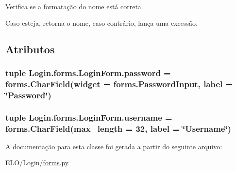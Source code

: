 Verifica se a formatação do nome está correta. 

Caso esteja, retorna o nome, caso contrário, lança uma excessão. 

\subsection{Atributos}
\hypertarget{classLogin_1_1forms_1_1LoginForm_a23e321f790e9c7bfc3e9abf767826a2d}{
\subsubsection[{password}]{\setlength{\rightskip}{0pt plus 5cm}tuple Login.\-forms.\-Login\-Form.\-password = forms.\-Char\-Field(widget = forms.\-Password\-Input, label = \char`\"{}Password\char`\"{})\hspace{0.3cm}{\ttfamily [static]}}}\label{d0/db9/classLogin_1_1forms_1_1LoginForm_a23e321f790e9c7bfc3e9abf767826a2d}
\hypertarget{classLogin_1_1forms_1_1LoginForm_af3766bb4ea8cabdf57ad77214b7545fd}{
\subsubsection[{username}]{\setlength{\rightskip}{0pt plus 5cm}tuple Login.\-forms.\-Login\-Form.\-username = forms.\-Char\-Field(max\-\_\-length = 32, label = \char`\"{}Username\char`\"{})\hspace{0.3cm}{\ttfamily [static]}}}\label{d0/db9/classLogin_1_1forms_1_1LoginForm_af3766bb4ea8cabdf57ad77214b7545fd}


A documentação para esta classe foi gerada a partir do seguinte arquivo\-:\begin{DoxyCompactItemize}
\item 
E\-L\-O/\-Login/\hyperlink{Login_2forms_8py}{forms.\-py}\end{DoxyCompactItemize}
